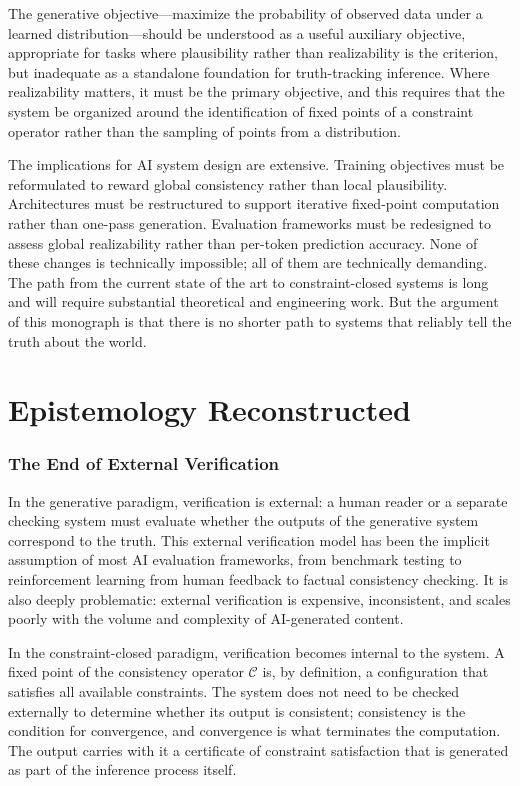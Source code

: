\documentclass[11pt, oneside]{article}
\begin{document}
The generative objective---maximize the probability of observed data under a learned distribution---should be understood as a useful auxiliary objective, appropriate for tasks where plausibility rather than realizability is the criterion, but inadequate as a standalone foundation for truth-tracking inference. Where realizability matters, it must be the primary objective, and this requires that the system be organized around the identification of fixed points of a constraint operator rather than the sampling of points from a distribution.

The implications for AI system design are extensive. Training objectives must be reformulated to reward global consistency rather than local plausibility. Architectures must be restructured to support iterative fixed-point computation rather than one-pass generation. Evaluation frameworks must be redesigned to assess global realizability rather than per-token prediction accuracy. None of these changes is technically impossible; all of them are technically demanding. The path from the current state of the art to constraint-closed systems is long and will require substantial theoretical and engineering work. But the argument of this monograph is that there is no shorter path to systems that reliably tell the truth about the world.

\part{Epistemology Reconstructed}

\section{The End of External Verification}

In the generative paradigm, verification is external: a human reader or a separate checking system must evaluate whether the outputs of the generative system correspond to the truth. This external verification model has been the implicit assumption of most AI evaluation frameworks, from benchmark testing to reinforcement learning from human feedback to factual consistency checking. It is also deeply problematic: external verification is expensive, inconsistent, and scales poorly with the volume and complexity of AI-generated content.

In the constraint-closed paradigm, verification becomes internal to the system. A fixed point of the consistency operator $\mathcal{C}$ is, by definition, a configuration that satisfies all available constraints. The system does not need to be checked externally to determine whether its output is consistent; consistency is the condition for convergence, and convergence is what terminates the computation. The output carries with it a certificate of constraint satisfaction that is generated as part of the inference process itself.
\end{document}
